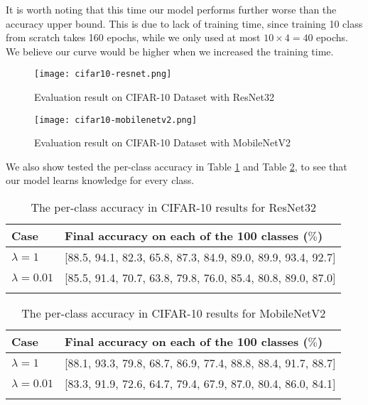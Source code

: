 It is worth noting that this time our model performs further worse than the accuracy upper bound. This is due to lack of training time, since training 10 class from scratch takes 160 epochs, while we only used at most $10 \times 4 = 40$ epochs. We believe our curve would be higher when we increased the training time.
\begin{figure}[!htp]
	\centering
	\texttt{[image: cifar10-resnet.png]}
	\caption[Evaluation result on CIFAR-10 Dataset with ResNet32]
	{Evaluation result on CIFAR-10 Dataset with ResNet32}
	\label{fig:cifar10-resnet}
\end{figure}
\begin{figure}[!htp]
	\centering
	\texttt{[image: cifar10-mobilenetv2.png]}
	\caption[Evaluation result on CIFAR-10 Dataset with MobileNetV2]
	{Evaluation result on CIFAR-10 Dataset with MobileNetV2}
	\label{fig:cifar10-mobilenetv2}
\end{figure}
We also show tested the per-class accuracy in Table \ref{tab:cifar10_resnet} and Table \ref{tab:cifar10_mobilenetv2}, to see that our model learns knowledge for every class.
\begin{table}[!hpb]
	\centering
	\caption[The per-class accuracy in CIFAR-10 results for ResNet32]
	{The per-class accuracy in CIFAR-10 results for ResNet32}
	\label{tab:firstone}
	\begin{tabular}{@{}lp{10cm}@{}} \toprule
		Case &  Final accuracy on each of the 100 classes ($\%$)\\ \midrule
		$\lambda=1$  &[88.5, 94.1, 82.3, 65.8, 87.3, 84.9, 89.0, 89.9, 93.4, 92.7]
		\\
		$\lambda=0.01$  & [85.5, 91.4, 70.7, 63.8, 79.8, 76.0, 85.4, 80.8, 89.0, 87.0]\\ \bottomrule
		\label{tab:cifar10_resnet}
	\end{tabular}
\end{table}

\begin{table}[!hpb]
	\centering
	\caption[The per-class accuracy in CIFAR-10 results for MobileNetV2]
	{The per-class accuracy in CIFAR-10 results for MobileNetV2}
	\label{tab:firstone}
	\begin{tabular}{@{}lp{10cm}@{}} \toprule
		Case &  Final accuracy on each of the 100 classes ($\%$)\\ \midrule
		$\lambda=1$  &[88.1, 93.3, 79.8, 68.7, 86.9, 77.4, 88.8, 88.4, 91.7, 88.7]
		
		\\
		$\lambda=0.01$  & [83.3, 91.9, 72.6, 64.7, 79.4, 67.9, 87.0, 80.4, 86.0, 84.1]
		\\ \bottomrule
		\label{tab:cifar10_mobilenetv2}
	\end{tabular}
\end{table}
